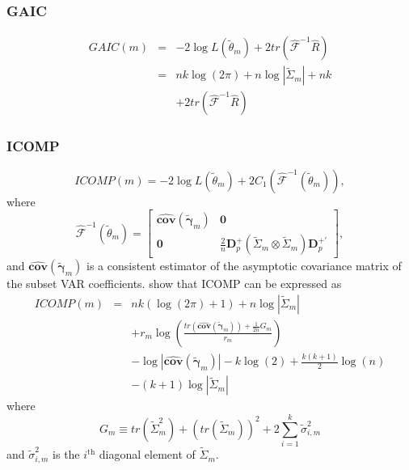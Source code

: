 \subsubsection{GAIC}

\begin{eqnarray*}
GAIC\left(m\right) & = & -2\log L\left(\widetilde{\theta}_{m}\right)+2tr\left(\hat{\mathcal{F}}^{-1}\hat{R}\right)\\
 & = & nk\log\left(2\pi\right)+n\log\left\vert \widetilde{\Sigma}_{m}\right\vert +nk\\
 &  & +2tr\left(\hat{\mathcal{F}}^{-1}\hat{R}\right)
\end{eqnarray*}



\subsubsection{ICOMP}

\[
ICOMP\left(m\right)=-2\log L\left(\widetilde{\theta}_{m}\right)+2C_{1}\left(\hat{\mathcal{F}}^{-1}\left(\widetilde{\theta}_{m}\right)\right),
\]
where
\[
\hat{\mathcal{F}}^{-1}\left(\widetilde{\theta}_{m}\right)=\left[\begin{array}{cc}
\widehat{\mathbf{cov}}\left(\widetilde{\mathbf{\gamma}}_{m}\right) & \mathbf{0}\\
\mathbf{0} & \frac{2}{n}\mathbf{D}_{p}^{+}\left(\widetilde{\Sigma}_{m}\otimes\widetilde{\Sigma}_{m}\right)\mathbf{D}_{p}^{+\prime}
\end{array}\right],
\]
and $\widehat{\mathbf{cov}}\left(\widetilde{\mathbf{\gamma}}_{m}\right)$
is a consistent estimator of the asymptotic covariance matrix of the
subset VAR coefficients. \citet{Bea:Boz:1998} show that ICOMP can
be expressed as
\begin{eqnarray*}
ICOMP\left(m\right) & = & nk\left(\log\left(2\pi\right)+1\right)+n\log\left\vert \widetilde{\Sigma}_{m}\right\vert \\
 &  & +r_{m}\log\left(\frac{tr\left(\widehat{\mathbf{cov}}\left(\widetilde{\mathbf{\gamma}}_{m}\right)\right)+\frac{1}{2n}G_{m}}{r_{m}}\right)\\
 &  & -\log\left\vert \widehat{\mathbf{cov}}\left(\widetilde{\mathbf{\gamma}}_{m}\right)\right\vert -k\log\left(2\right)+\frac{k\left(k+1\right)}{2}\log\left(n\right)\\
 &  & -\left(k+1\right)\log\left\vert \widetilde{\Sigma}_{m}\right\vert 
\end{eqnarray*}
where
\[
G_{m}\equiv tr\left(\widetilde{\Sigma}_{m}^{2}\right)+\left(tr\left(\widetilde{\Sigma}_{m}\right)\right)^{2}+2\sum_{i=1}^{k}\widetilde{\sigma}_{i,m}^{2}
\]
and $\widetilde{\sigma}_{i,m}^{2}$ is the $i^{\text{th}}$ diagonal
element of $\widetilde{\Sigma}_{m}$.


